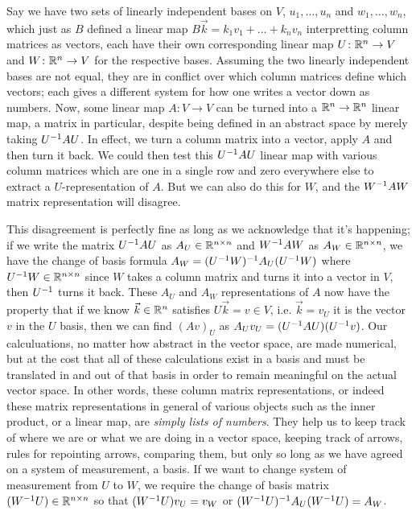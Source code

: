 \documentclass[11pt]{article}
\begin{document}
Say we have two sets of linearly independent bases on $V$, $u_1, \dots, u_n$ and $w_1, \dots, w_n$, which just as $B$ defined a linear map $B \vec k = k_1 v_1 + \dots + k_n v_n$ interpretting column matrices as vectors, each have their own corresponding linear map $U \colon \mathbb{R}^n \to V$ and $W\colon \mathbb{R}^n \to V$ for the respective bases. Assuming the two linearly independent bases are not equal, they are in conflict over which column matrices define which vectors; each gives a different system for how one writes a vector down as numbers. Now, some linear map $A \colon V \to V$ can be turned into a $\mathbb{R}^n \to \mathbb{R}^n$ linear map, a matrix in particular, despite being defined in an abstract space by merely taking $U^{-1} A U$. In effect, we turn a column matrix into a vector, apply $A$ and then turn it back. We could then test this $U^{-1} A U$ linear map with various column matrices which are one in a single row and zero everywhere else to extract a $U$-representation of $A$. But we can also do this for $W$, and the $W^{-1} A W$ matrix representation will disagree.

This disagreement is perfectly fine as long as we acknowledge that it's happening; if we write the matrix $U^{-1} A U$ as $A_U \in \mathbb{R}^{n\times n}$ and $W^{-1} A W$ as $A_W \in \mathbb{R}^{n \times n}$, we have the change of basis formula $A_W = (U^{-1} W)^{-1} A_U (U^{-1} W)$ where $U^{-1} W \in \mathbb{R}^{n \times n}$ since $W$ takes a column matrix and turns it into a vector in $V$, then $U^{-1}$ turns it back. These $A_U$ and $A_W$ representations of $A$ now have the property that if we know $\vec k \in \mathbb{R}^n$ satisfies $U \vec k = v \in V$, i.e. $\vec k = v_U$ it is the vector $v$ in the $U$ basis, then we can find $(Av)_U$ as $A_U v_U = (U^{-1} A U) (U^{-1} v)$. Our calculuations, no matter how abstract in the vector space, are made numerical, but at the cost that all of these calculations exist in a basis and must be translated in and out of that basis in order to remain meaningful on the actual vector space. In other words, these column matrix representations, or indeed these matrix representations in general of various objects such as the inner product, or a linear map, are \emph{simply lists of numbers}. They help us to keep track of where we are or what we are doing in a vector space, keeping track of arrows, rules for repointing arrows, comparing them, but only so long as we have agreed on a system of measurement, a basis. If we want to change system of measurement from $U$ to $W$, we require the change of basis matrix $(W^{-1} U) \in \mathbb{R}^{n \times n}$ so that $(W^{-1} U) v_U = v_W$ or $(W^{-1} U)^{-1} A_U (W^{-1} U) = A_W$.
\end{document}
